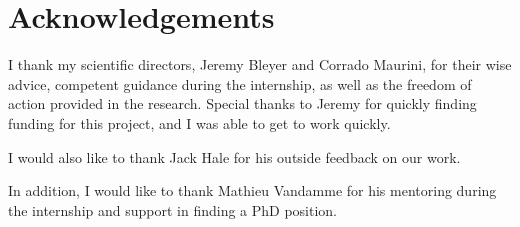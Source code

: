 \documentclass[12pt]{article}
\begin{document}



\section*{\centering Acknowledgements}
\setcounter{page}{2}

I thank my scientific directors, Jeremy Bleyer and Corrado Maurini, for their wise advice, competent guidance during the internship, as well as the freedom of action provided in the research. Special thanks to Jeremy for quickly finding funding for this project, and I was able to get to work quickly.

I would also like to thank Jack Hale for his outside feedback on our work. 

In addition, I would like to thank Mathieu Vandamme for his mentoring during the internship and support in finding a PhD position.


\end{document}
